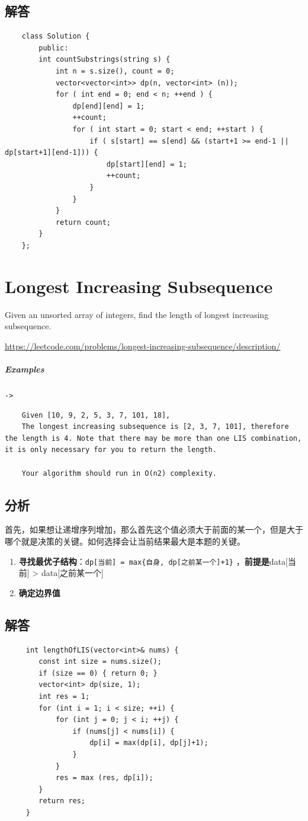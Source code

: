 \documentclass[UTF8,a4paper,12pt]{ctexbook}
\begin{document}
	\subsection{解答}
		\begin{lstlisting}
	class Solution {
		public:
		int countSubstrings(string s) {
			int n = s.size(), count = 0;
			vector<vector<int>> dp(n, vector<int> (n));
			for ( int end = 0; end < n; ++end ) {
				dp[end][end] = 1;
				++count;
				for ( int start = 0; start < end; ++start ) {
					if ( s[start] == s[end] && (start+1 >= end-1 || dp[start+1][end-1])) {
						dp[start][end] = 1;
						++count;
					}
				}
			}
			return count;
		}
	};
		\end{lstlisting}
\section{Longest Increasing Subsequence}
	Given an unsorted array of integers, find the length of longest increasing subsequence.
	
	\url{https://leetcode.com/problems/longest-increasing-subsequence/description/}
	\subparagraph{Examples}\verb|->|
		\begin{lstlisting}
	Given [10, 9, 2, 5, 3, 7, 101, 18],
	The longest increasing subsequence is [2, 3, 7, 101], therefore the length is 4. Note that there may be more than one LIS combination, it is only necessary for you to return the length.
	
	Your algorithm should run in O(n2) complexity.
		\end{lstlisting}
	\subsection{分析}
		首先，如果想让递增序列增加，那么首先这个值必须大于前面的某一个，但是大于哪个就是决策的关键。如何选择会让当前结果最大是本题的关键。
		\begin{enumerate}
			\item \textbf{寻找最优子结构}：\verb|dp[当前] = max{自身, dp[之前某一个]+1}| ，\textbf{前提是}data[当前] > data[之前某一个]
			\item \textbf{确定边界值}
		\end{enumerate}
	\subsection{解答}
		\begin{lstlisting}
	 int lengthOfLIS(vector<int>& nums) {
	 	const int size = nums.size();
	 	if (size == 0) { return 0; } 
	 	vector<int> dp(size, 1);
	 	int res = 1;
	 	for (int i = 1; i < size; ++i) {
	 		for (int j = 0; j < i; ++j) {
	 			if (nums[j] < nums[i]) {
	 				dp[i] = max(dp[i], dp[j]+1);
	 			}
	 		}
	 		res = max (res, dp[i]);
	 	}
	 	return res;
	 }
		\end{lstlisting}
\end{document}
